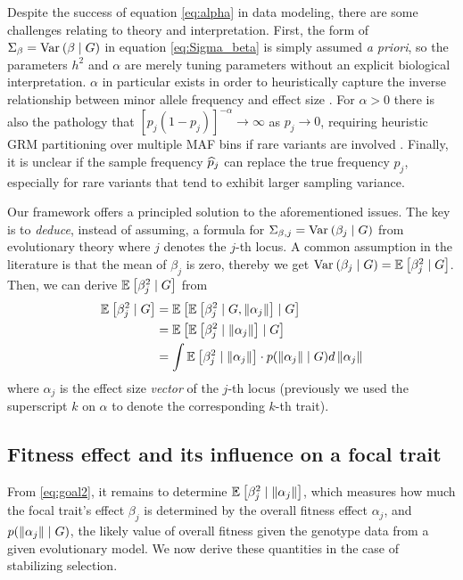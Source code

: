 \documentclass[10pt]{article}
\begin{document}
Despite the success of equation \eqref{eq:alpha} in data modeling, there are some challenges relating to theory and interpretation.
First, the form of $\Sigma_\beta = \mathrm{Var}_{}\left(\beta \mid G\right)$ in equation \eqref{eq:Sigma_beta} is simply assumed \emph{a priori}, so the parameters $h^2$ and $\alpha$ are merely tuning parameters without an explicit biological interpretation. $\alpha$ in particular exists in order to heuristically capture the inverse relationship between minor allele frequency and effect size \citep{Zeng_2018,Schoech_2019}.
For $\alpha>0$ there is also the pathology that $[p_j(1-p_j)]^{-\alpha}\to\infty$  as $p_j\to 0$, requiring heuristic GRM partitioning over multiple MAF bins if rare variants are involved \citep{Yang_2015,Wainschtein_2022}.
Finally, it is unclear if the sample frequency $\widehat{p}_j$ can replace the true frequency $p_j$, especially for rare variants that tend to exhibit larger sampling variance.

Our framework offers a principled solution to the aforementioned issues.
The key is to \emph{deduce}, instead of assuming, a formula for $\Sigma_{\beta,j} = \mathrm{Var}_{}\left(\beta_j \mid G\right)$ from evolutionary theory where $j$ denotes the $j$-th locus.
A common assumption in the literature is that the mean of $\beta_j$ is zero,
thereby we get $\mathrm{Var}_{}\left(\beta_j \mid G\right) = \mathbb{E}_{}\left[\beta_j^2 \mid G\right]$.
Then, we can derive $\mathbb{E}_{}\left[\beta_j^2 \mid G\right]$ from
\begin{equation}
    \label{eq:goal2}
\begin{aligned} 
    \mathbb{E}_{}\left[\beta_j^2 \mid G\right] &= \mathbb{E}_{}\left[\mathbb{E}_{}\left[\beta_j^2 \mid G, \left\| \alpha_j \right\|\right] \mid G\right]\\
    &= \mathbb{E}_{}\left[\mathbb{E}_{}\left[\beta_j^2 \mid \left\| \alpha_j \right\|\right] \mid G\right]\\
    &= \int \mathbb{E}_{}\left[\beta_j^2 \mid \left\| \alpha_j \right\|\right] \cdot p(\left\| \alpha_j \right\| \mid G) d\left\| \alpha_j \right\|
\end{aligned}
\end{equation}
where $\alpha_j$ is the effect size \emph{vector} of the $j$-th locus (previously we used the superscript $k$ on $\alpha$ to denote the corresponding $k$-th trait).

\subsection{Fitness effect and its influence on a focal trait}
From \eqref{eq:goal2}, it remains to determine $\mathbb{E}_{}\left[\beta_j^2 \mid \left\| \alpha_j \right\|\right]$, which measures how much the focal trait's effect $\beta_j$ is determined by the overall fitness effect $\alpha_j$,
and $p(\left\| \alpha_j \right\| \mid G)$, the likely value of overall fitness given the genotype data
from a given evolutionary model. We now derive these quantities in the case of stabilizing selection. 
\end{document}

